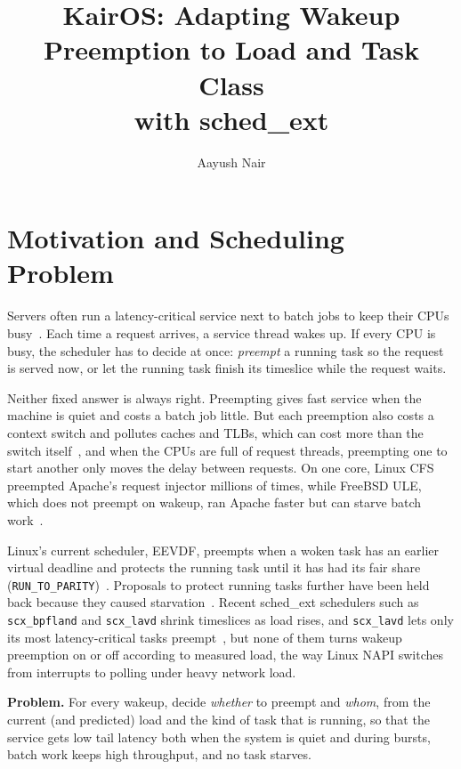 \documentclass[letterpaper,twocolumn,10pt]{article}
\begin{document}
\date{}
\title{\Large \bf KairOS: Adapting Wakeup Preemption to Load and Task Class\\with sched\_ext}
\author{{\rm Aayush Nair}}
\maketitle

\section{Motivation and Scheduling Problem}

Servers often run a latency-critical service next to batch jobs to keep
their CPUs busy~\cite{heracles,caladan}. Each time a request arrives, a
service thread wakes up. If every CPU is busy, the scheduler has to decide
at once: \emph{preempt} a running task so the request is served now, or let
the running task finish its timeslice while the request waits.

Neither fixed answer is always right. Preempting gives fast service when
the machine is quiet and costs a batch job little. But each preemption also
costs a context switch and pollutes caches and TLBs, which can cost more
than the switch itself~\cite{flexsc}, and when the CPUs are full of request
threads, preempting one to start another only moves the delay between
requests. On one core, Linux CFS preempted Apache's request injector
millions of times, while FreeBSD ULE, which does not preempt on wakeup, ran
Apache faster but can starve batch work~\cite{battle}.

Linux's current scheduler, EEVDF, preempts when a woken task has an earlier
virtual deadline and protects the running task until it has had its fair
share (\texttt{RUN\_TO\_PARITY})~\cite{eevdf}. Proposals to protect running
tasks further have been held back because they caused
starvation~\cite{r2pw}. Recent sched\_ext schedulers such as
\texttt{scx\_bpfland} and \texttt{scx\_lavd} shrink timeslices as load rises,
and \texttt{scx\_lavd} lets only its most latency-critical tasks
preempt~\cite{scx}, but none of them turns wakeup preemption on or off
according to measured load, the way Linux NAPI switches from interrupts to
polling under heavy network load.

\textbf{Problem.} For every wakeup, decide \emph{whether} to preempt and
\emph{whom}, from the current (and predicted) load and the kind of task that
is running, so that the service gets low tail latency both when the system
is quiet and during bursts, batch work keeps high throughput, and no task
starves.
\end{document}
